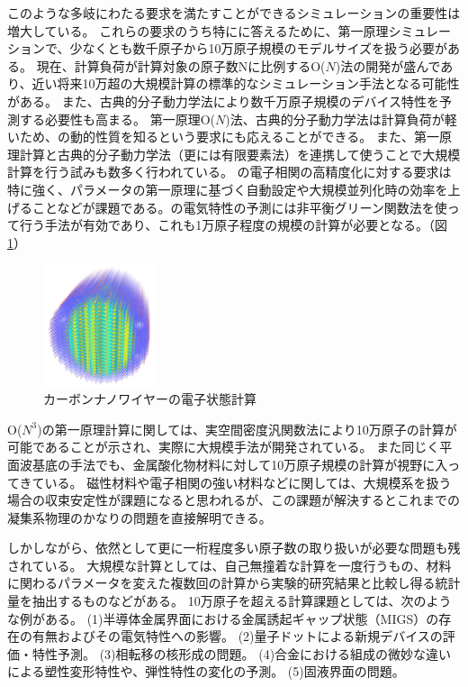 このような多岐にわたる要求を満たすことができるシミュレーションの重要性は増大している。
これらの要求のうち特にに答えるために、第一原理シミュレーションで、少なくとも数千原子から10万原子規模のモデルサイズを扱う必要がある。
現在、計算負荷が計算対象の原子数Nに比例するO($N$)法の開発が盛んであり、近い将来10万超の大規模計算の標準的なシミュレーション手法となる可能性がある。
また、古典的分子動力学法により数千万原子規模のデバイス特性を予測する必要性も高まる。
第一原理O($N$)法、古典的分子動力学法は計算負荷が軽いため、の動的性質を知るという要求にも応えることができる。
また、第一原理計算と古典的分子動力学法（更には有限要素法）を連携して使うことで大規模計算を行う試みも数多く行われている。
の電子相関の高精度化に対する要求は特に強く、パラメータの第一原理に基づく自動設定や大規模並列化時の効率を上げることなどが課題である。の電気特性の予測には非平衡グリーン関数法を使って行う手法が有効であり、これも1万原子程度の規模の計算が必要となる。（図\ref{fig:4-2_2}）
\begin{figure}[H]
  \centering
  \includegraphics[width=0.3\textwidth]{figs/4-2_2.pdf}
  \caption{カーボンナノワイヤーの電子状態計算}
  \label{fig:4-2_2}
\end{figure}

O($N^3$)の第一原理計算に関しては、実空間密度汎関数法により10万原子の計算が可能であることが示され、実際に大規模手法が開発されている。
また同じく平面波基底の手法でも、金属酸化物材料に対して10万原子規模の計算が視野に入ってきている。
磁性材料や電子相関の強い材料などに関しては、大規模系を扱う場合の収束安定性が課題になると思われるが、この課題が解決するとこれまでの凝集系物理のかなりの問題を直接解明できる。

しかしながら、依然として更に一桁程度多い原子数の取り扱いが必要な問題も残されている。
大規模な計算としては、自己無撞着な計算を一度行うもの、材料に関わるパラメータを変えた複数回の計算から実験的研究結果と比較し得る統計量を抽出するものなどがある。
10万原子を超える計算課題としては、次のような例がある。
(1)半導体金属界面における金属誘起ギャップ状態（MIGS）の存在の有無およびその電気特性への影響。
(2)量子ドットによる新規デバイスの評価・特性予測。
(3)相転移の核形成の問題。
(4)合金における組成の微妙な違いによる塑性変形特性や、弾性特性の変化の予測。
(5)固液界面の問題。


